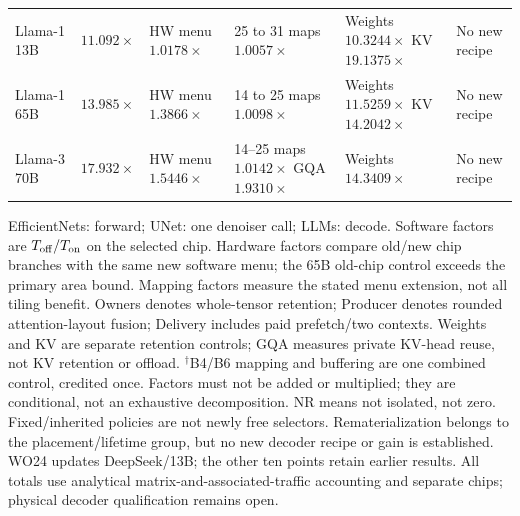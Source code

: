 \begin{table}[H]
\begin{tabularx}{\linewidth}{@{}l r *{4}{>{\raggedright\arraybackslash}X}@{}}
Llama-1 13B & $11.092\times$ & \shortstack[l]{HW menu\\$1.0178\times$} & \shortstack[l]{25 to 31 maps\\$1.0057\times$} & \shortstack[l]{Weights $10.3244\times$\\KV $19.1375\times$} & No new recipe \\
Llama-1 65B & $13.985\times$ & \shortstack[l]{HW menu\\$1.3866\times$} & \shortstack[l]{14 to 25 maps\\$1.0098\times$} & \shortstack[l]{Weights $11.5259\times$\\KV $14.2042\times$} & No new recipe \\
Llama-3 70B & $17.932\times$ & \shortstack[l]{HW menu\\$1.5446\times$} & \shortstack[l]{14--25 maps $1.0142\times$\\GQA $1.9310\times$} & \shortstack[l]{Weights\\$14.3409\times$} & No new recipe \\
\bottomrule
\end{tabularx}
\par\smallskip\begin{minipage}{\linewidth}\footnotesize
EfficientNets: forward; UNet: one denoiser call; LLMs: decode. Software factors
are $T_{\rm off}/T_{\rm on}$ on the selected chip. Hardware factors compare
old/new chip branches with the same new software menu; the 65B old-chip control
exceeds the primary area bound. Mapping factors measure the stated menu
extension, not all tiling benefit. Owners denotes whole-tensor retention;
Producer denotes rounded attention-layout fusion; Delivery includes paid
prefetch/two contexts. Weights and KV are separate retention controls;
GQA measures private KV-head reuse, not KV retention or offload.
$^\dagger$B4/B6 mapping and buffering are one combined control, credited once.
Factors must not be added or multiplied; they are conditional, not an
exhaustive decomposition. NR means not isolated, not zero. Fixed/inherited
policies are not newly free selectors. Rematerialization belongs to the
placement/lifetime group, but no new decoder recipe or gain is established.
WO24 updates DeepSeek/13B; the other ten points retain earlier results.
All totals use analytical matrix-and-associated-traffic accounting and
separate chips; physical decoder qualification remains open.
\end{minipage}
\end{table}
